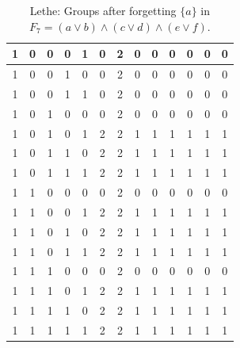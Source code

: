 \begin{table}[!tb]
\begin{tabular}{|c|c|c|c|c|c|c|c|c|c|c|c|c|}
        \rowcolor{red!40} 1 & 0 & 0 & 0 & 1 & 0 & 2 & 0 & 0 & 0 & 0 & 0 & 0 \\ \hline
        \rowcolor{green!40} 1 & 0 & 0 & 1 & 0 & 0 & 2 & 0 & 0 & 0 & 0 & 0 & 0 \\ \hline
        \rowcolor{yellow!40} 1 & 0 & 0 & 1 & 1 & 0 & 2 & 0 & 0 & 0 & 0 & 0 & 0 \\ \hline
        \rowcolor{gray!40} 1 & 0 & 1 & 0 & 0 & 0 & 2 & 0 & 0 & 0 & 0 & 0 & 0 \\ \hline
        \rowcolor{blue!40} 1 & 0 & 1 & 0 & 1 & 2 & 2 & 1 & 1 & 1 & 1 & 1 & 1 \\ \hline
        \rowcolor{red!40} 1 & 0 & 1 & 1 & 0 & 2 & 2 & 1 & 1 & 1 & 1 & 1 & 1 \\ \hline
        \rowcolor{green!40} 1 & 0 & 1 & 1 & 1 & 2 & 2 & 1 & 1 & 1 & 1 & 1 & 1 \\ \hline
        \rowcolor{yellow!40} 1 & 1 & 0 & 0 & 0 & 0 & 2 & 0 & 0 & 0 & 0 & 0 & 0 \\ \hline
        \rowcolor{gray!40} 1 & 1 & 0 & 0 & 1 & 2 & 2 & 1 & 1 & 1 & 1 & 1 & 1 \\ \hline
        \rowcolor{blue!40} 1 & 1 & 0 & 1 & 0 & 2 & 2 & 1 & 1 & 1 & 1 & 1 & 1 \\ \hline
        \rowcolor{red!40} 1 & 1 & 0 & 1 & 1 & 2 & 2 & 1 & 1 & 1 & 1 & 1 & 1 \\ \hline
        \rowcolor{green!40} 1 & 1 & 1 & 0 & 0 & 0 & 2 & 0 & 0 & 0 & 0 & 0 & 0 \\ \hline
        \rowcolor{yellow!40} 1 & 1 & 1 & 0 & 1 & 2 & 2 & 1 & 1 & 1 & 1 & 1 & 1 \\ \hline
        \rowcolor{gray!40} 1 & 1 & 1 & 1 & 0 & 2 & 2 & 1 & 1 & 1 & 1 & 1 & 1 \\ \hline
        \rowcolor{blue!40} 1 & 1 & 1 & 1 & 1 & 2 & 2 & 1 & 1 & 1 & 1 & 1 & 1 \\ \hline
    \end{tabular}
    \caption{Lethe: Groups after forgetting $\{a\}$ in $F_{7} = (a \lor b) \land (c \lor d) \land (e \lor f)$.}
    \label{tab:lethe-F7-a-groups}
\end{table}
